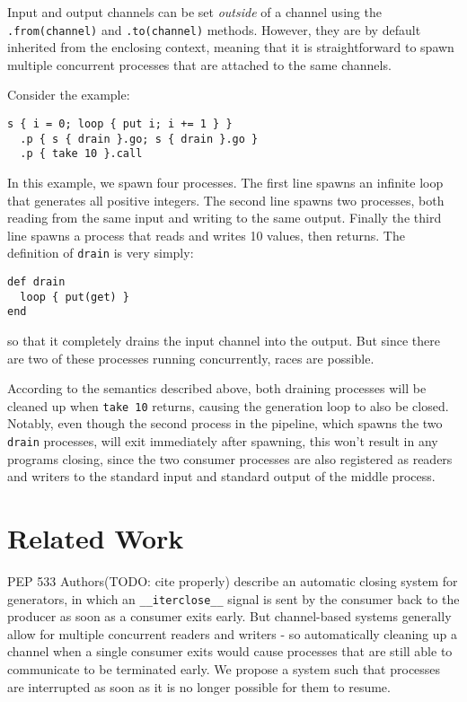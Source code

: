 \documentclass[format=sigconf, review=true, draft=true, screen=true]{acmart}
\begin{document}
Input and output channels can be set \emph{outside} of a channel using the \verb/.from(channel)/ and \verb/.to(channel)/ methods.
However, they are by default inherited from the enclosing context, meaning that it is straightforward to spawn multiple concurrent processes that are attached to the same channels.

Consider the example:

\begin{verbatim}
s { i = 0; loop { put i; i += 1 } }
  .p { s { drain }.go; s { drain }.go }
  .p { take 10 }.call
\end{verbatim}
In this example, we spawn four processes.
The first line spawns an infinite loop that generates all positive integers.
The second line spawns two processes, both reading from the same input and writing to the same output.
Finally the third line spawns a process that reads and writes 10 values, then returns. The definition of \verb/drain/ is very simply:

\begin{verbatim}
def drain
  loop { put(get) }
end
\end{verbatim}
so that it completely drains the input channel into the output.
But since there are two of these processes running concurrently, races are possible.

According to the semantics described above, both draining processes will be cleaned up when \verb/take 10/ returns, causing the generation loop to also be closed.
Notably, even though the second process in the pipeline, which spawns the two \verb/drain/ processes, will exit immediately after spawning, this won't result in any programs closing, since the two consumer processes are also registered as readers and writers to the standard input and standard output of the middle process.




\section{Related Work}

PEP 533 Authors(TODO: cite properly) describe an automatic closing system for generators, in which an \verb/__iterclose__/ signal is sent by the consumer back to the producer as soon as a consumer exits early.
But channel-based systems generally allow for multiple concurrent readers and writers - so automatically cleaning up a channel when a single consumer exits would cause processes that are still able to communicate to be terminated early.
We propose a system such that processes are interrupted as soon as it is no longer possible for them to resume.
\end{document}
